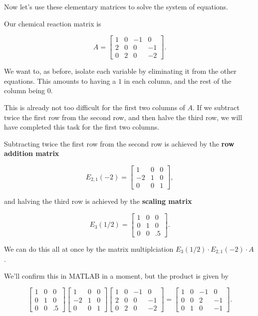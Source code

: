 \documentclass{ximera}
\begin{document}
\begin{solution}
Now let's use these elementary matrices to solve the system of equations.

Our chemical reaction matrix is 

\begin{equation*}
  A = \begin{bmatrix}
    1 & 0 & -1 & 0 \\
    2 & 0 & 0 & -1 \\
    0 & 2 & 0 & -2
  \end{bmatrix}.
\end{equation*}

We want to, as before, isolate each variable by eliminating it from the other equations. This amounts to having a $1$ in each column, and the rest of the column being $0$.

This is already not too difficult for the first two columns of $A$. If we subtract twice the first row from the second row, and then halve the third row, we will have completed this task for the first two columns.

Subtracting twice the first row from the second row is achieved by the \textbf{row addition matrix} 

$$E_{2,1}(-2)=\begin{bmatrix}1 & 0 & 0 \\ -2 & 1 & 0 \\ 0 & 0 & 1\end{bmatrix},$$

and halving the third row is achieved by the \textbf{scaling matrix}

$$E_{3}(1/2)=\begin{bmatrix}1 & 0 & 0 \\ 0 & 1 & 0 \\ 0 & 0 & .5\end{bmatrix}.$$

We can do this all at once by the matrix multiplciation $E_{3}(1/2)\cdot E_{2,1}(-2)\cdot A$.

We'll confirm this in MATLAB in a moment, but the product is given by 

\begin{equation*}
 \begin{bmatrix}
    1 & 0 & 0 \\
    0 & 1 & 0 \\
    0 & 0 & .5
  \end{bmatrix} \begin{bmatrix}
    1 & 0 & 0 \\
    -2 & 1 & 0 \\
    0 & 0 & 1
  \end{bmatrix} \begin{bmatrix}
    1 & 0 & -1 & 0 \\
    2 & 0 & 0 & -1 \\
    0 & 2 & 0 & -2
  \end{bmatrix} = \begin{bmatrix}
    1 & 0 & -1 & 0 \\
    0 & 0 & 2 & -1 \\
    0 & 1 & 0 & -1
  \end{bmatrix}.
\end{equation*}


\end{solution}
\end{document}
